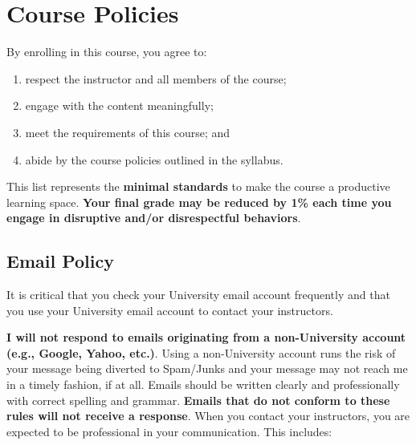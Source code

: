 \documentclass[
  letterpaper,
]{article}
\providecommand{\tightlist}{%
  \setlength{\itemsep}{0pt}\setlength{\parskip}{0pt}}\usepackage{longtable,booktabs,array}
\begin{document}
\hypertarget{sec-policies}{%
\section{Course Policies}\label{sec-policies}}

By enrolling in this course, you agree to:

\begin{enumerate}
\def\labelenumi{\arabic{enumi}.}
\tightlist
\item
  respect the instructor and all members of the course;
\item
  engage with the content meaningfully;
\item
  meet the requirements of this course; and
\item
  abide by the course policies outlined in the syllabus.
\end{enumerate}

This list represents the \textbf{minimal standards} to make the course a
productive learning space. \textbf{Your final grade may be reduced by
1\% each time you engage in disruptive and/or disrespectful behaviors}.

\hypertarget{email-policy}{%
\subsection{Email Policy}\label{email-policy}}

\begin{tcolorbox}[enhanced jigsaw, bottomrule=.15mm, leftrule=.75mm, toptitle=1mm, titlerule=0mm, breakable, toprule=.15mm, opacityback=0, colbacktitle=quarto-callout-note-color!10!white, colback=white, title=\textcolor{quarto-callout-note-color}{\faInfo}\hspace{0.5em}{Note}, bottomtitle=1mm, arc=.35mm, rightrule=.15mm, coltitle=black, colframe=quarto-callout-note-color-frame, left=2mm, opacitybacktitle=0.6]

It is critical that you check your University email account frequently
and that you use your University email account to contact your
instructors.

\end{tcolorbox}

\textbf{I will not respond to emails originating from a non-University
account (e.g., Google, Yahoo, etc.)}. Using a non-University account
runs the risk of your message being diverted to Spam/Junks and your
message may not reach me in a timely fashion, if at all. Emails should
be written clearly and professionally with correct spelling and grammar.
\textbf{Emails that do not conform to these rules will not receive a
response}. When you contact your instructors, you are expected to be
professional in your communication. This includes:
\end{document}
